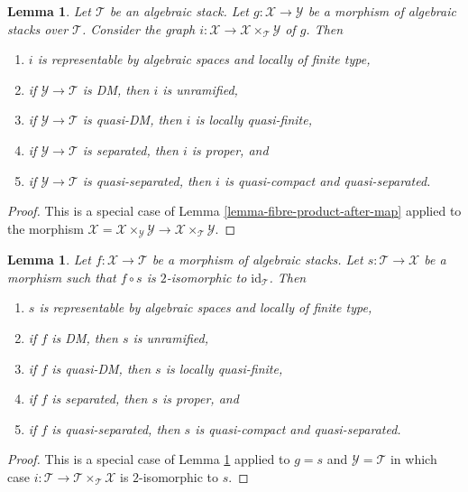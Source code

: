\documentclass{stacks-project}
\theoremstyle{plain}
\newtheorem{lemma}[subsection]{Lemma}
\theoremstyle{definition}
\theoremstyle{remark}
\numberwithin{equation}{subsection}
\begin{document}
\begin{lemma}
\label{lemma-semi-diagonal}
Let $\mathcal{T}$ be an algebraic stack. Let $g : \mathcal{X} \to \mathcal{Y}$
be a morphism of algebraic stacks over $\mathcal{T}$. Consider the graph
$i : \mathcal{X} \to \mathcal{X} \times_\mathcal{T} \mathcal{Y}$ of $g$. Then
\begin{enumerate}
\item $i$ is representable by algebraic spaces and locally of finite type,
\item if $\mathcal{Y} \to \mathcal{T}$ is DM, then $i$ is unramified,
\item if $\mathcal{Y} \to \mathcal{T}$ is quasi-DM, then $i$ is locally
quasi-finite,
\item if $\mathcal{Y} \to \mathcal{T}$ is separated, then $i$ is proper, and
\item if $\mathcal{Y} \to \mathcal{T}$ is quasi-separated, then $i$ is
quasi-compact and quasi-separated.
\end{enumerate}
\end{lemma}

\begin{proof}
This is a special case of Lemma \ref{lemma-fibre-product-after-map}
applied to the morphism
$\mathcal{X} = \mathcal{X} \times_\mathcal{Y} \mathcal{Y} \to
\mathcal{X} \times_\mathcal{T} \mathcal{Y}$.
\end{proof}

\begin{lemma}
\label{lemma-section-immersion}
Let $f : \mathcal{X} \to \mathcal{T}$ be a morphism of algebraic stacks.
Let $s : \mathcal{T} \to \mathcal{X}$ be a morphism such that
$f \circ s$ is $2$-isomorphic to $\text{id}_\mathcal{T}$. Then
\begin{enumerate}
\item $s$ is representable by algebraic spaces and locally of finite type,
\item if $f$ is DM, then $s$ is unramified,
\item if $f$ is quasi-DM, then $s$ is locally quasi-finite,
\item if $f$ is separated, then $s$ is proper, and
\item if $f$ is quasi-separated, then $s$ is quasi-compact and quasi-separated.
\end{enumerate}
\end{lemma}

\begin{proof}
This is a special case of Lemma \ref{lemma-semi-diagonal} applied to
$g = s$ and $\mathcal{Y} = \mathcal{T}$ in which case
$i : \mathcal{T} \to \mathcal{T} \times_\mathcal{T} \mathcal{X}$
is $2$-isomorphic to $s$.
\end{proof}
\end{document}
